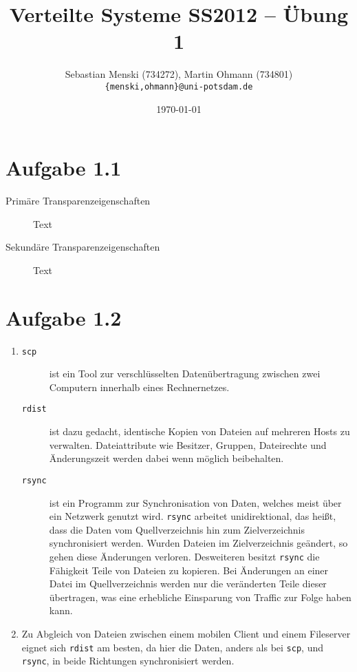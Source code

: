 \documentclass[german,12pt,a4paper]{article}
\begin{document}
\title{\textbf{Verteilte Systeme SS2012 -- Übung 1}}
\author{Sebastian Menski (734272), Martin Ohmann (734801) \\ \texttt{\{menski,ohmann\}@uni-potsdam.de}}
\date{\today}

\maketitle

\section*{Aufgabe 1.1}

\begin{description}
	\item[Primäre Transparenzeigenschaften] Text
	\item[Sekundäre Transparenzeigenschaften] Text
\end{description}


\section*{Aufgabe 1.2}

\begin{enumerate}
	\item 
		\begin{description}
			\item[\texttt{scp}] ist ein Tool zur verschlüsselten Datenübertragung 
				zwischen zwei Computern innerhalb eines Rechnernetzes.
			\item[\texttt{rdist}] ist dazu gedacht, identische Kopien von Dateien 
				auf mehreren Hosts zu verwalten. Dateiattribute wie Besitzer, Gruppen, 
				Dateirechte und Änderungszeit werden dabei wenn möglich beibehalten.
			\item[\texttt{rsync}] ist ein Programm zur Synchronisation von Daten, 
				welches meist über ein Netzwerk genutzt wird. \texttt{rsync} arbeitet
				unidirektional, das heißt, dass die Daten vom 
				Quellverzeichnis hin zum Zielverzeichnis synchronisiert werden. Wurden 
				Dateien im Zielverzeichnis geändert, so gehen diese Änderungen verloren.
				Desweiteren besitzt \texttt{rsync} die Fähigkeit Teile von Dateien 
				zu kopieren. Bei Änderungen an einer Datei im Quellverzeichnis werden 
				nur die veränderten Teile dieser übertragen, was eine erhebliche Einsparung von 
				Traffic zur Folge haben kann.
		\end{description}
	\item Zu Abgleich von Dateien zwischen einem mobilen Client und einem Fileserver 
		eignet sich \texttt{rdist} am besten, da hier die Daten, anders als bei \texttt{scp},
		und \texttt{rsync}, in beide Richtungen synchronisiert werden.
\end{enumerate}
\end{document}
